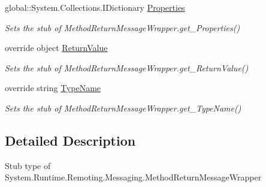 \begin{DoxyCompactItemize}
global\-::\-System.\-Collections.\-I\-Dictionary \hyperlink{class_system_1_1_runtime_1_1_remoting_1_1_messaging_1_1_fakes_1_1_stub_method_return_message_wrapper_af2c4a50a18db51a2cacfb3bbffed3810}{Properties}
\begin{DoxyCompactList}\small\item\em Sets the stub of Method\-Return\-Message\-Wrapper.\-get\-\_\-\-Properties()\end{DoxyCompactList}\item 
override object \hyperlink{class_system_1_1_runtime_1_1_remoting_1_1_messaging_1_1_fakes_1_1_stub_method_return_message_wrapper_a9fa0a3439053cfaa462624b8fc6ab78c}{Return\-Value}
\begin{DoxyCompactList}\small\item\em Sets the stub of Method\-Return\-Message\-Wrapper.\-get\-\_\-\-Return\-Value()\end{DoxyCompactList}\item 
override string \hyperlink{class_system_1_1_runtime_1_1_remoting_1_1_messaging_1_1_fakes_1_1_stub_method_return_message_wrapper_a64f9403112a2a4524ebdfe776ded47b6}{Type\-Name}
\begin{DoxyCompactList}\small\item\em Sets the stub of Method\-Return\-Message\-Wrapper.\-get\-\_\-\-Type\-Name()\end{DoxyCompactList}\end{DoxyCompactItemize}


\subsection{Detailed Description}
Stub type of System.\-Runtime.\-Remoting.\-Messaging.\-Method\-Return\-Message\-Wrapper



